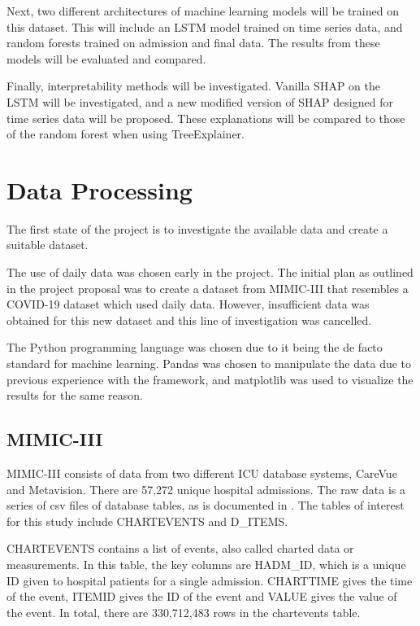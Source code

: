 \documentclass[12pt]{article}
\begin{document}
Next, two different architectures of machine learning models will be trained on this dataset. This will include an LSTM model trained on time series data, and random forests trained on admission and final data. The results from these models will be evaluated and compared. 

Finally, interpretability methods will be investigated. Vanilla SHAP on the LSTM will be investigated, and a new modified version of SHAP designed for time series data will be proposed. These explanations will be compared to those of the random forest when using TreeExplainer. 

\section{Data Processing}

The first state of the project is to investigate the available data and create a suitable dataset. 

The use of daily data was chosen early in the project. The initial plan as outlined in the project proposal was to create a dataset from MIMIC-III that resembles a COVID-19 dataset which used daily data. However, insufficient data was obtained for this new dataset and this line of investigation was cancelled.

The Python programming language was chosen due to it being the de facto standard for machine learning. Pandas \cite{pandas} was chosen to manipulate the data due to previous experience with the framework, and matplotlib \cite{matplotlib} was used to visualize the results for the same reason. 

\subsection{MIMIC-III}

MIMIC-III consists of data from two different ICU database systems, CareVue and Metavision. There are 57,272 unique hospital admissions. The raw data is a series of csv files of database tables, as is documented in \cite{MIMICIIIdatabase}. The tables of interest for this study include CHARTEVENTS and D\_ITEMS.

CHARTEVENTS contains a list of events, also called charted data or measurements. In this table, the key columns are HADM\_ID, which is a unique ID given to hospital patients for a single admission. CHARTTIME gives the time of the event, ITEMID gives the ID of the event and VALUE gives the value of the event. In total, there are 330,712,483 rows in the chartevents table.
\end{document}
